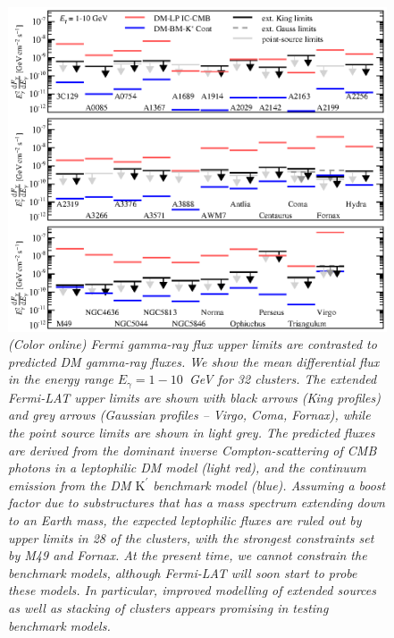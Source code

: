 \documentclass[10pt,aps,pra,reprint,amsmath,amsfonts,amssymb,showpacs,nofootinbib,floatfix]{revtex4-1}
\newcommand{\Fermi}{{\em Fermi}\xspace}
\newcommand{\rmn}{\mathrm}
\newcommand{\Kp}{\rmn{K}^\prime}
\begin{document}
\begin{figure}
\begin{minipage}{2.0\columnwidth}
  \includegraphics[width=0.99\columnwidth]{figures/Fermi.comp.DM.eps}
  \caption{\it (Color online) \Fermi gamma-ray flux upper limits are
    contrasted to predicted DM gamma-ray fluxes. We show the mean
    differential flux in the energy range $E_\gamma=1-10$~GeV for 32
    clusters. The extended \Fermi-LAT upper limits are shown with
    black arrows (King profiles) and grey arrows (Gaussian profiles --
    Virgo, Coma, Fornax), while the point source limits are shown in
    light grey. The predicted fluxes are derived from the dominant
    inverse Compton-scattering of CMB photons in a leptophilic DM
    model (light red), and the continuum emission from the DM $\Kp$
    benchmark model (blue). Assuming a boost factor due to
    substructures that has a mass spectrum extending down to an Earth
    mass, the expected leptophilic fluxes are ruled out by upper
    limits in 28 of the clusters, with the strongest constraints set
    by M49 and Fornax. At the present time, we cannot constrain the
    benchmark models, although \Fermi-LAT will soon start to probe
    these models. In particular, improved modelling of extended
    sources as well as stacking of clusters appears promising in
    testing benchmark models.}
 \label{fig14}
\end{minipage}
\end{figure}
\end{document}
